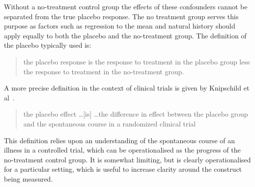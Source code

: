 


Without a no-treatment control group the effects of these confounders cannot be separated from the true placebo response.  The no treatment group serves this purpose as factors such as regression to the mean and natural history should apply equally to both the placebo and the no-treatment group.  The definition of the placebo typically used is:
\begin{quotation}
 the placebo response is the response to treatment in the placebo group less the response to treatment in the no-treatment group.  
\end{quotation}

A more precise definition in the context of clinical trials is given by Knipschild et al~\cite{Knipschild2005}. 

\begin{quote}
   the placebo effect \ldots [is] \ldots the difference in effect between the placebo group and the spontaneous course in a randomized clinical trial 
\end{quote}



This definition relies upon an understanding of the spontaneous course of an illness in a controlled trial, which can be operationalised as the progress of the no-treatment control group. It is somewhat limiting, but is clearly operationalised for a particular setting, which is useful to increase clarity around the construct  being measured. %

